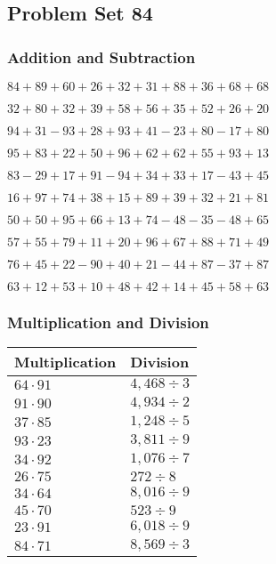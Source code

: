 \hypertarget{problem-set-84}{%
\subsection{Problem Set 84}\label{problem-set-84}}

\hypertarget{addition-and-subtraction}{%
\subsubsection{Addition and
Subtraction}\label{addition-and-subtraction}}

\(84+89+60+26+32+31+88+36+68+68\)

\(32+80+32+39+58+56+35+52+26+20\)

\(94+31-93+28+93+41-23+80-17+80\)

\(95+83+22+50+96+62+62+55+93+13\)

\(83-29+17+91-94+34+33+17-43+45\)

\(16+97+74+38+15+89+39+32+21+81\)

\(50+50+95+66+13+74-48-35-48+65\)

\(57+55+79+11+20+96+67+88+71+49\)

\(76+45+22-90+40+21-44+87-37+87\)

\(63+12+53+10+48+42+14+45+58+63\)

\hypertarget{multiplication-and-division}{%
\subsubsection{Multiplication and
Division}\label{multiplication-and-division}}

\begin{longtable}[]{@{}ll@{}}
\toprule
Multiplication & Division\tabularnewline
\midrule
\endhead
\(64\cdot91\) & \(4,468÷3\)\tabularnewline
\(91\cdot90\) & \(4,934÷2\)\tabularnewline
\(37\cdot85\) & \(1,248÷5\)\tabularnewline
\(93\cdot23\) & \(3,811÷9\)\tabularnewline
\(34\cdot92\) & \(1,076÷7\)\tabularnewline
\(26\cdot75\) & \(272÷8\)\tabularnewline
\(34\cdot64\) & \(8,016÷9\)\tabularnewline
\(45\cdot70\) & \(523÷9\)\tabularnewline
\(23\cdot91\) & \(6,018÷9\)\tabularnewline
\(84\cdot71\) & \(8,569÷3\)\tabularnewline
\bottomrule
\end{longtable}
